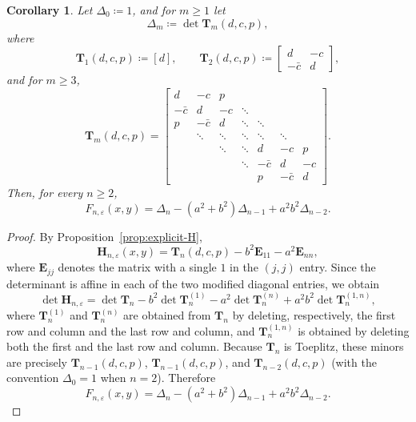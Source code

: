 \documentclass[11pt]{article}
\newtheorem{corollary}[theorem]{Corollary}
\begin{document}
\begin{corollary}\label{cor:Toeplitz-reduction}
Let $\Delta_0\coloneqq 1$, and for $m\ge 1$ let
\[
\Delta_m\coloneqq \det \mathbf{T}_m(d,c,p),
\]
where
\[
\mathbf{T}_1(d,c,p)\coloneqq [d],
\qquad
\mathbf{T}_2(d,c,p)\coloneqq
\begin{bmatrix}
d & -c \\
-\bar c & d
\end{bmatrix},
\]
and for $m\ge 3$,
\[
\mathbf{T}_m(d,c,p)
=\begin{bmatrix}
d & -c & p \\
-\bar c & d & -c & \ddots \\
p & -\bar c & d & \ddots & \ddots \\
& \ddots & \ddots & \ddots & \ddots & \ddots \\
&& \ddots & \ddots & d & -c & p \\
&&& \ddots & -\bar c & d & -c \\
&&&& p & -\bar c & d
\end{bmatrix}.
\]
Then, for every $n\ge 2$,
\[
F_{n,\varepsilon}(x,y)
=\Delta_n-(a^2+b^2)\Delta_{n-1}+a^2b^2\Delta_{n-2}.
\]
\end{corollary}

\begin{proof}
By Proposition~\ref{prop:explicit-H},
\[
\mathbf{H}_{n,\varepsilon}(x,y)=\mathbf{T}_n(d,c,p)-b^2\mathbf{E}_{11}-a^2\mathbf{E}_{nn},
\]
where $\mathbf{E}_{jj}$ denotes the matrix with a single $1$ in the $(j,j)$ entry.
Since the determinant is affine in each of the two modified diagonal entries, we obtain
\[
\det \mathbf{H}_{n,\varepsilon}
=\det \mathbf{T}_n
-b^2\det \mathbf{T}_n^{(1)}
-a^2\det \mathbf{T}_n^{(n)}
+a^2b^2\det \mathbf{T}_n^{(1,n)},
\]
where $\mathbf{T}_n^{(1)}$ and $\mathbf{T}_n^{(n)}$ are obtained from $\mathbf{T}_n$ by deleting,
respectively, the first row and column and the last row and column, and
$\mathbf{T}_n^{(1,n)}$ is obtained by deleting both the first and the last row and column.
Because $\mathbf{T}_n$ is Toeplitz, these minors are precisely
$\mathbf{T}_{n-1}(d,c,p)$, $\mathbf{T}_{n-1}(d,c,p)$, and $\mathbf{T}_{n-2}(d,c,p)$
(with the convention $\Delta_0=1$ when $n=2$).
Therefore
\[
F_{n,\varepsilon}(x,y)
=\Delta_n-(a^2+b^2)\Delta_{n-1}+a^2b^2\Delta_{n-2}.
\]
\end{proof}
\end{document}
